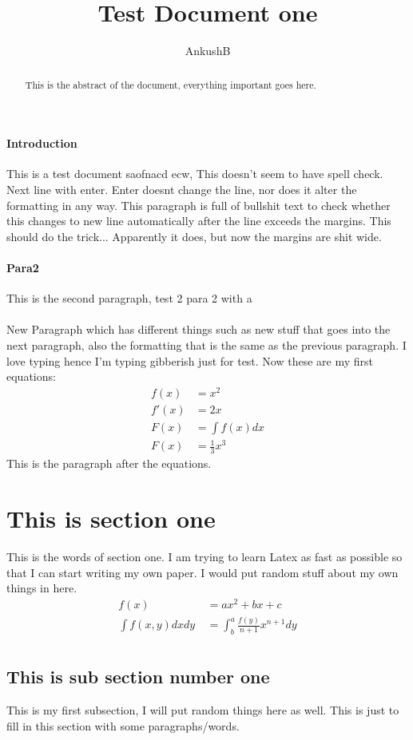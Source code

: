 \documentclass[a4paper,13pt]{article}
\title{Test Document one}
\author{AnkushB}
\numberwithin{equation}{section}
\begin{document}
\maketitle
\begin{abstract}
This is the abstract of the document, everything important goes here.
\end{abstract}
\tableofcontents{}
\paragraph{Introduction}
This is a test document saofnacd ecw, This doesn't seem to have spell check. 
Next line with enter. Enter doesnt change the line, nor does it alter the formatting in any way.
This paragraph is full of bullshit text to check whether this changes to new line automatically after the line exceeds the margins. This should do the trick... Apparently it does, but now the margins are shit wide.
\paragraph{Para2}
This is the second paragraph, test 2 para 2 with a 
\paragraph {}
New Paragraph which has different things such as new stuff that goes into the next paragraph, also the formatting that is the same as the previous paragraph. I love typing hence I'm typing gibberish just for test. Now these are my first equations:
\begin{align}
f(x) &= x^2\\
f'(x) &= 2x\\
F(x) &= \int f(x)dx\\
F(x) &= \frac{1}{3}x^3  %
\end{align}
This is the paragraph after the equations. 
\section{This is section one}
This is the words of section one. I am trying to learn Latex as fast as possible so that I can start writing my own paper. I would put random stuff about my own things in here.
\begin{align}
f(x) &= ax^2+bx+c\\
\int f(x,y)dxdy\ &= \int^{a}_{b} \frac{f(y)}{n+1}x^{n+1} dy\\
\end{align}
\subsection{This is sub section number one}
This is my first subsection, I will put random things here as well. This is just to fill in this section with some paragraphs/words.
\end{document}
